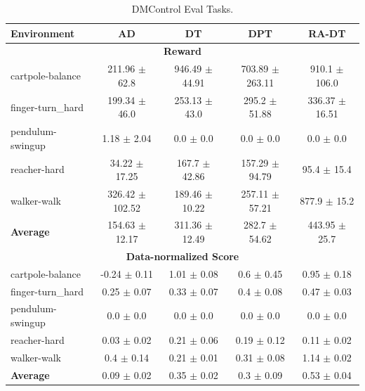 \begin{table}[h]
    \centering
    \caption{DMControl Eval Tasks.}
\begin{tabular}{lcccc}
    \toprule
    \textbf{Environment}                    &  \textbf{AD}        & \textbf{DT} & \textbf{DPT} & \textbf{RA-DT} \\
    \midrule
    \multicolumn{5}{c}{\textbf{Reward}} \\
    cartpole-balance                                             & 211.96 $\pm$ 62.8   & 946.49 $\pm$ 44.91  & 703.89 $\pm$ 263.11 & 910.1 $\pm$ 106.0    \\
    finger-turn\_hard                                            & 199.34 $\pm$ 46.0   & 253.13 $\pm$ 43.0   & 295.2 $\pm$ 51.88   & 336.37 $\pm$ 16.51  \\
    pendulum-swingup                                             & 1.18 $\pm$ 2.04     & 0.0 $\pm$ 0.0       & 0.0 $\pm$ 0.0       & 0.0 $\pm$ 0.0       \\
    reacher-hard                                                 & 34.22 $\pm$ 17.25   & 167.7 $\pm$ 42.86  & 157.29 $\pm$ 94.79 & 95.4 $\pm$ 15.4    \\
    walker-walk                                                  & 326.42 $\pm$ 102.52 & 189.46 $\pm$ 10.22  & 257.11 $\pm$ 57.21  & 877.9 $\pm$ 15.2    \\
    \textbf{Average}                                             &         154.63 $\pm$ 12.17 &        311.36 $\pm$ 12.49 &        282.7 $\pm$ 54.62 &       443.95 $\pm$ 25.7 \\
    \midrule
    \multicolumn{5}{c}{\textbf{Data-normalized Score}} \\
    cartpole-balance                                             & -0.24 $\pm$ 0.11  & 1.01 $\pm$ 0.08   & 0.6 $\pm$ 0.45   & 0.95 $\pm$ 0.18   \\
    finger-turn\_hard                                            & 0.25 $\pm$ 0.07   & 0.33 $\pm$ 0.07   & 0.4 $\pm$ 0.08   & 0.47 $\pm$ 0.03   \\
    pendulum-swingup                                             & 0.0 $\pm$ 0.0     & 0.0 $\pm$ 0.0     & 0.0 $\pm$ 0.0     & 0.0 $\pm$ 0.0     \\
    reacher-hard                                                 & 0.03 $\pm$ 0.02   & 0.21 $\pm$ 0.06   & 0.19 $\pm$ 0.12  & 0.11 $\pm$ 0.02   \\
    walker-walk                                                  & 0.4 $\pm$ 0.14    & 0.21 $\pm$ 0.01   & 0.31 $\pm$ 0.08   & 1.14 $\pm$ 0.02   \\
    \textbf{Average}    &   0.09 $\pm$ 0.02 &           0.35 $\pm$ 0.02 &    0.3 $\pm$ 0.09   &   0.53 $\pm$ 0.04 \\
    \bottomrule
    \end{tabular}
    \label{tab:dmcontrol-eval}
\end{table}


